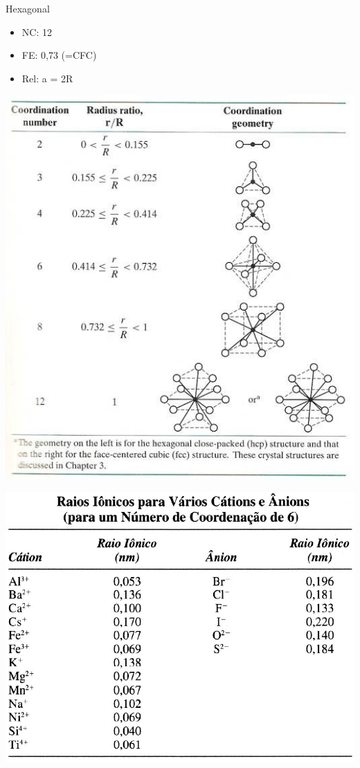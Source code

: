 Hexagonal

\begin{itemize}
	
	\setlength{\parskip}{0pt}
	\setlength{\itemsep}{0pt plus 1pt}
	
	\item NC: 12
	\item FE: 0,73 (=CFC)
	\item Rel: a = 2R
\end{itemize}


\includegraphics[scale=0.5,trim={0 0 0 0}]{figures/RELraio}


\includegraphics[scale=0.3,trim={0 0 0 0}]{figures/raio}


